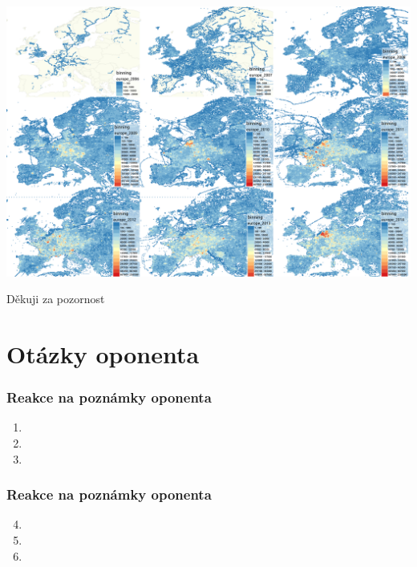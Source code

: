 \documentclass[unicode,bookmarksnumbered]{beamer}
\begin{document}
	\begin{frame}
	\centering
	\includegraphics[width=1\textwidth]{./img/osm/merge.png}
	
	\Huge Děkuji za pozornost
	\end{frame}
	
	
	
	
	\section{Otázky oponenta}
	\begin{frame}
		\frametitle{Reakce na poznámky oponenta}
		\small
		\begin{enumerate}
			\item 
			\pause[]  
			
			\item 
			
			\pause[] 
			\item
		\end{enumerate}
	\end{frame}
	

	
	
	
	\begin{frame}
		\frametitle{Reakce na poznámky oponenta}
		\small
		\begin{enumerate}
			\setcounter{enumi}{3}
			\item 
			
			\pause[] 
			\item

			\pause[]  
			\item 
		\end{enumerate}
	\end{frame}
	
	
	
	
	
\end{document}
